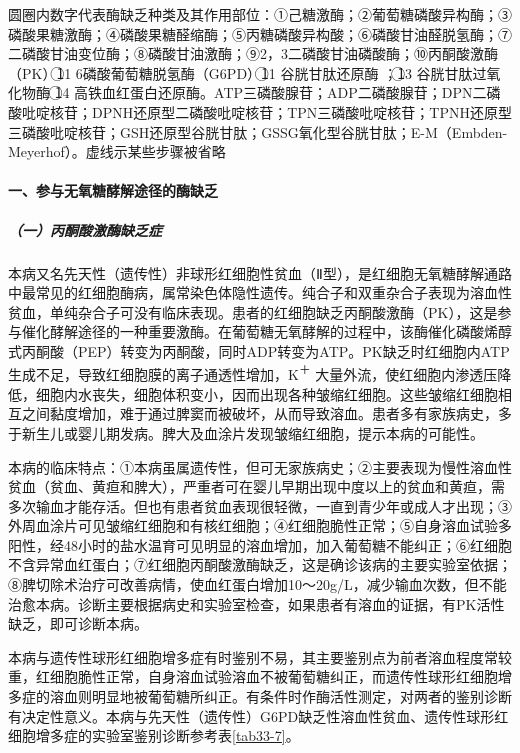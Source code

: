 圆圈内数字代表酶缺乏种类及其作用部位：①己糖激酶；②葡萄糖磷酸异构酶；③磷酸果糖激酶；④磷酸果糖醛缩酶；⑤丙糖磷酸异构酸；⑥磷酸甘油醛脱氢酶；⑦二磷酸甘油变位酶；⑧磷酸甘油激酶；⑨2，3二磷酸甘油磷酸酶；⑩丙酮酸激酶（PK）\textcircled{11}
6磷酸葡萄糖脱氢酶（G6PD）\textcircled{11}
谷胱甘肽还原酶 ；\textcircled{13}
谷胱甘肽过氧化物酶 \textcircled{14}
高铁血红蛋白还原酶。ATP三磷酸腺苷；ADP二磷酸腺苷；DPN二磷酸吡啶核苷；DPNH还原型二磷酸吡啶核苷；TPN三磷酸吡啶核苷；TPNH还原型三磷酸吡啶核苷；GSH还原型谷胱甘肽；GSSG氧化型谷胱甘肽；E-M（Embden-Meyerhof）。虚线示某些步骤被省略

\paragraph{一、参与无氧糖酵解途径的酶缺乏}

\subparagraph{（一）丙酮酸激酶缺乏症}

本病又名先天性（遗传性）非球形红细胞性贫血（Ⅱ型），是红细胞无氧糖酵解通路中最常见的红细胞酶病，属常染色体隐性遗传。纯合子和双重杂合子表现为溶血性贫血，单纯杂合子可没有临床表现。患者的红细胞缺乏丙酮酸激酶（PK），这是参与催化酵解途径的一种重要激酶。在葡萄糖无氧酵解的过程中，该酶催化磷酸烯醇式丙酮酸（PEP）转变为丙酮酸，同时ADP转变为ATP。PK缺乏时红细胞内ATP生成不足，导致红细胞膜的离子通透性增加，K\textsuperscript{＋}
大量外流，使红细胞内渗透压降低，细胞内水丧失，细胞体积变小，因而出现各种皱缩红细胞。这些皱缩红细胞相互之间黏度增加，难于通过脾窦而被破坏，从而导致溶血。患者多有家族病史，多于新生儿或婴儿期发病。脾大及血涂片发现皱缩红细胞，提示本病的可能性。

本病的临床特点：①本病虽属遗传性，但可无家族病史；②主要表现为慢性溶血性贫血（贫血、黄疸和脾大），严重者可在婴儿早期出现中度以上的贫血和黄疸，需多次输血才能存活。但也有患者贫血表现很轻微，一直到青少年或成人才出现；③外周血涂片可见皱缩红细胞和有核红细胞；④红细胞脆性正常；⑤自身溶血试验多阳性，经48小时的盐水温育可见明显的溶血增加，加入葡萄糖不能纠正；⑥红细胞不含异常血红蛋白；⑦红细胞丙酮酸激酶缺乏，这是确诊该病的主要实验室依据；⑧脾切除术治疗可改善病情，使血红蛋白增加10～20g/L，减少输血次数，但不能治愈本病。诊断主要根据病史和实验室检查，如果患者有溶血的证据，有PK活性缺乏，即可诊断本病。

本病与遗传性球形红细胞增多症有时鉴别不易，其主要鉴别点为前者溶血程度常较重，红细胞脆性正常，自身溶血试验溶血不被葡萄糖纠正，而遗传性球形红细胞增多症的溶血则明显地被葡萄糖所纠正。有条件时作酶活性测定，对两者的鉴别诊断有决定性意义。本病与先天性（遗传性）G6PD缺乏性溶血性贫血、遗传性球形红细胞增多症的实验室鉴别诊断参考表\ref{tab33-7}。


